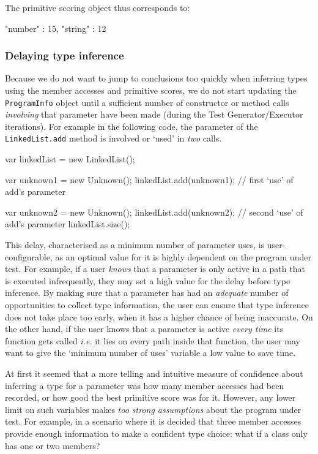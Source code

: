 The primitive scoring object thus corresponds to:

\begin{code}[caption=Primitive scoring, label=primitivescore]
   {
      "number" : 15,
      "string" : 12
   }
\end{code}

\subsubsection{Delaying type inference}
Because we do not want to jump to conclusions too quickly when inferring types using the member accesses and primitive scores, we do not start updating the \texttt{ProgramInfo} object until a sufficient number of constructor or method calls \emph{involving} that parameter have been made (during the \textsf{Test Generator/Executor} iterations). For example in the following code, the parameter of the \texttt{LinkedList.add} method is involved or `used' in \emph{two} calls.

\begin{code}[caption=Parameter uses,label=uses]
var linkedList = new LinkedList();

var unknown1 = new Unknown();
linkedList.add(unknown1); // first `use' of add's parameter

var unknown2 = new Unknown();
linkedList.add(unknown2); // second `use' of add's parameter
linkedList.size();
\end{code}

This delay, characterised as a minimum number of parameter uses, is user-configurable, as an optimal value for it is highly dependent on the program under test. For example, if a user \emph{knows} that a parameter is only active in a path that is executed infrequently, they may set a high value for the delay before type inference. By making sure that a parameter has had an \emph{adequate} number of opportunities to collect type information, the user can ensure that type inference does not take place too early, when it has a higher chance of being inaccurate. On the other hand, if the user knows that a parameter is active \emph{every time} its function gets called \emph{i.e.} it lies on every path inside that function, the user may want to give the `minimum number of uses' variable a low value to save time.

At first it seemed that a more telling and intuitive measure of confidence about inferring a type for a parameter was how many member accesses had been recorded, or how good the best primitive score was for it. However, any lower limit on such variables makes \emph{too strong assumptions} about the program under test. For example, in a scenario where it is decided that three member accesses provide enough information to make a confident type choice: what if a class only has one or two members?

